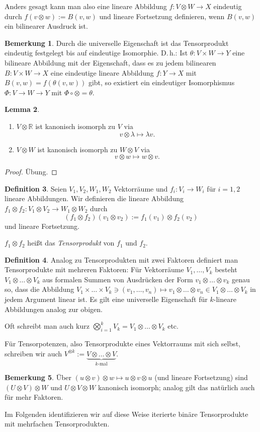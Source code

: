 \documentclass[a4paper]{scrreprt}
\numberwithin{equation}{chapter}
\newcommand{\R}{\mathbb{R}}
\theoremstyle{definition}
\newtheorem{defn}{Definition}[section]
\newtheorem{lemma}[defn]{Lemma}
\newtheorem{bem}[defn]{Bemerkung}
\newcommand{\bewUeb}{\begin{proof}Übung.\end{proof}}
\begin{document}
Anders gesagt kann man also eine lineare Abbildung $f\colon V\otimes W\to X$ eindeutig durch $f(v\otimes w) := B(v,w)$ und lineare Fortsetzung definieren, wenn $B(v,w)$ ein bilinearer Ausdruck ist.
\begin{bem}
	Durch die universelle Eigenschaft ist das Tensorprodukt eindeutig festgelegt bis auf eindeutige Isomorphie. D.\,h.: Ist $\theta\colon V\times W\to Y$ eine bilineare Abbildung mit der Eigenschaft, dass es zu jedem bilinearen $B\colon V\times W \to X$ eine eindeutige lineare Abbildung $f\colon Y\to X$ mit $B(v,w) = f(\theta(v,w))$ gibt, so existiert ein eindeutiger Isomorphismus $\Phi\colon V\to W\to Y$ mit $\Phi\circ\otimes = \theta$.
\end{bem}
\begin{lemma}
	\begin{enumerate}[label=(\alph*)]
		\item $V\otimes\R$ ist kanonisch isomorph zu $V$ via
		\[v\otimes\lambda \mapsto \lambda v.\]
		\item $V\otimes W$ ist kanonisch isomorph zu $W\otimes V$ via
		\[v\otimes w \mapsto w\otimes v.\]
	\end{enumerate}
	\bewUeb
\end{lemma}

\begin{defn}
	Seien $V_1,V_2, W_1, W_2$ Vektorräume und $f_i\colon V_i \to W_i$ für $i=1,2$ lineare Abbildungen. Wir definieren die lineare Abbildung $f_1\otimes f_2 \colon V_1\otimes V_2 \to W_1\otimes W_2$ durch
	\[(f_1\otimes f_2)(v_1\otimes v_2) := f_1(v_1) \otimes f_2(v_2)\]
	und lineare Fortsetzung.

	$f_1\otimes f_2$ heißt das \emph{Tensorprodukt} von $f_1$ und $f_2$.
\end{defn}

\begin{defn}
	Analog zu Tensorprodukten mit zwei Faktoren definiert man Tensorprodukte mit mehreren Faktoren: Für Vektorräume $V_1, \dots, V_k$ besteht $V_1 \otimes \dots \otimes V_k$ aus formalen Summen von Ausdrücken der Form $v_1 \otimes \dots \otimes v_k$ genau so, dass die Abbildung $V_1 \times \dots \times V_k \ni (v_1,\dots,v_n) \mapsto v_1 \otimes \dots \otimes v_n \in V_1 \otimes \dots \otimes V_k$ in jedem Argument linear ist. Es gilt eine universelle Eigenschaft für $k$-lineare Abbildungen analog zur obigen.

	Oft schreibt man auch kurz $\bigotimes_{i=1}^k V_k = V_1 \otimes \dots \otimes V_k$ etc.

	Für \glqq Tensorpotenzen\grqq, also Tensorprodukte eines Vektorraums mit sich selbst, schreiben wir auch $V^{\otimes k} := \underbrace{V \otimes \dots \otimes V}_\text{$k$-mal}$.
\end{defn}
\begin{bem}
	Über $(u\otimes v)\otimes w \mapsto u\otimes v\otimes u$ (und lineare Fortsetzung) sind $(U\otimes V)\otimes W$ und $U\otimes V\otimes W$ kanonisch isomorph; analog gilt das natürlich auch für mehr Faktoren.

	Im Folgenden identifizieren wir auf diese Weise iterierte binäre Tensorprodukte mit mehrfachen Tensorprodukten.
\end{bem}
\end{document}
